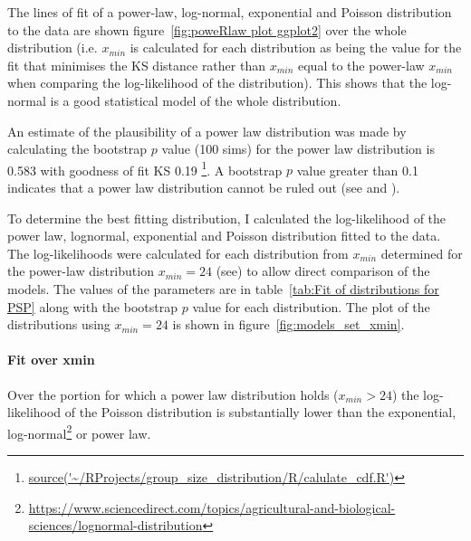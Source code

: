The lines of fit of a power-law, log-normal, exponential and Poisson distribution to the data are shown figure~\ref{fig:poweRlaw plot ggplot2} over the whole distribution (i.e. $x_{min}$ is calculated for each distribution as being the value for the fit that minimises the KS distance rather than $x_{min}$ equal to the power-law $x_{min}$ when comparing the log-likelihood of the distribution). This shows that the log-normal is a good statistical model of the whole distribution.

An estimate of the plausibility of a power law distribution was made by calculating the bootstrap $p$ value (100 sims) for the power law distribution is 0.583 with goodness of fit KS 0.19 \footnote{\url{source('~/RProjects/group_size_distribution/R/calulate_cdf.R')}}. A bootstrap $p$ value greater than 0.1 indicates that a power law distribution cannot be ruled out (see \cite{gillespie2015fitting} and \cite{clauset2009power}).



To determine the best fitting distribution, I calculated the log-likelihood of the power law, lognormal, exponential and Poisson distribution fitted to the data. The log-likelihoods were calculated for each distribution from $x_{min}$ determined for the power-law distribution $x_{min} = 24$ (see\cite{clauset2009power}) to allow direct comparison of the models. The values of the parameters are in table~\ref{tab:Fit of distributions for PSP} along with the bootstrap $p$ value for each distribution. The plot of the distributions using $x_{min}=24$ is shown in figure~\ref{fig:models_set_xmin}.


\paragraph{Fit over xmin}
Over the portion for which a power law distribution holds ($x_{min}>24$) the log-likelihood of the Poisson distribution is substantially lower than the exponential, log-normal\footnote{\url{https://www.sciencedirect.com/topics/agricultural-and-biological-sciences/lognormal-distribution}} or power law. 


